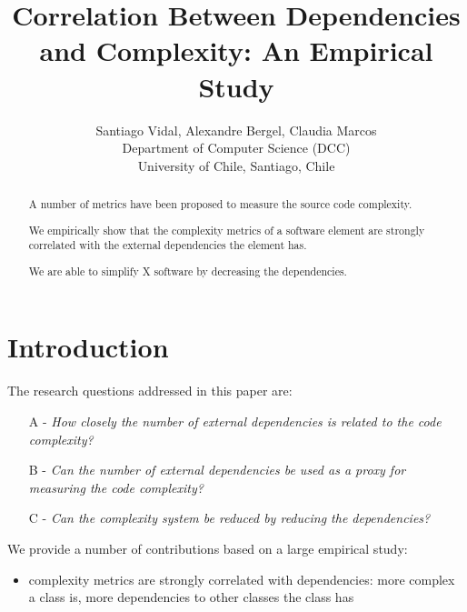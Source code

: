 \documentclass{sig-alternate}
\newcommand{\Title}{Correlation Between Dependencies and Complexity: An Empirical Study}
\newcommand{\TitleShort}{\Title}
\newcommand{\Authors}{Santiago Vidal, Alexandre Bergel, Claudia Marcos}
\newcommand{\AuthorsShort}{S. Vidal, A. Bergel, C. Marcos}
\newcommand{\seclabel}[1]{\label{sec:#1}}
\begin{document}
\title{\Title}

\author{\Authors\\[3mm]
Department of Computer Science (DCC)\\ University of Chile, Santiago, Chile\\[1 ex]
} 

\maketitle


\begin{abstract}
A number of metrics have been proposed to measure the source code complexity. 


We empirically show that the complexity metrics of a software element are strongly correlated with the external dependencies the element has.

We are able to simplify X software by decreasing the dependencies.

\end{abstract}

\section{Introduction}\seclabel{introduction}



The research questions addressed in this paper are:
\begin{itemize}
\item[A -] \emph{How closely the number of external dependencies is related to the code complexity?}
\item[B -] \emph{Can the number of external dependencies be used as a proxy for measuring the code complexity?}
\item[C -] \emph{Can the complexity system be reduced by reducing the dependencies?}
\end{itemize}

We provide a number of contributions based on a large empirical study:
\begin{itemize}
\item complexity metrics are strongly correlated with dependencies: more complex a class is, more dependencies to other classes the class has
\end{itemize}
\end{document}
